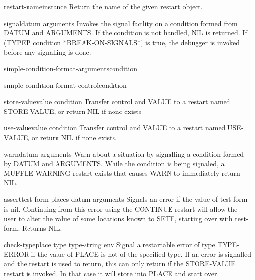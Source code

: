 \begin{function}{restart-name}{instance}
  Return the name of the given restart object.
\end{function}

\begin{function}{signal}{datum \rest arguments}
  Invokes the signal facility on a condition formed from DATUM and
   ARGUMENTS. If the condition is not handled, NIL is returned. If
   (TYPEP condition *BREAK-ON-SIGNALS*) is true, the debugger is invoked
   before any signalling is done.
\end{function}

\begin{function}{simple-condition-format-arguments}{condition}
  
\end{function}

\begin{function}{simple-condition-format-control}{condition}
  
\end{function}

\begin{function}{store-value}{value \op condition}
  Transfer control and VALUE to a restart named STORE-VALUE, or return NIL if
   none exists.
\end{function}

\begin{function}{use-value}{value \op condition}
  Transfer control and VALUE to a restart named USE-VALUE, or return NIL if
   none exists.
\end{function}

\begin{function}{warn}{datum \rest arguments}
  Warn about a situation by signalling a condition formed by DATUM and
   ARGUMENTS. While the condition is being signaled, a MUFFLE-WARNING restart
   exists that causes WARN to immediately return NIL.
\end{function}

\begin{macro}{assert}{test-form \op places datum \rest arguments}
  Signals an error if the value of test-form is nil. Continuing from this
   error using the CONTINUE restart will allow the user to alter the value of
   some locations known to SETF, starting over with test-form. Returns NIL.
\end{macro}

\begin{macro}{check-type}{place type \op type-string \env env}
  Signal a restartable error of type TYPE-ERROR if the value of PLACE
is not of the specified type. If an error is signalled and the restart
is used to return, this can only return if the STORE-VALUE restart is
invoked. In that case it will store into PLACE and start over.
\end{macro}


